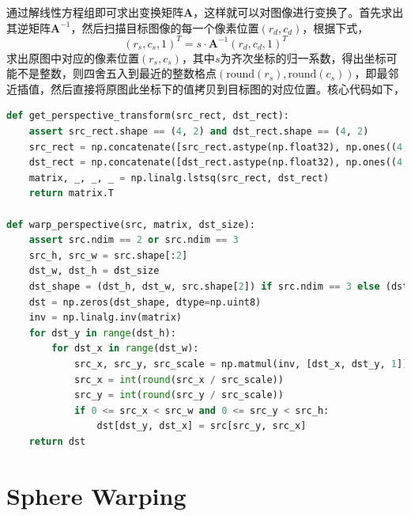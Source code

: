 \documentclass[12pt,a4paper]{article}
\begin{document}
通过解线性方程组即可求出变换矩阵$\boldsymbol{A}$，这样就可以对图像进行变换了。首先求出其逆矩阵$\boldsymbol{A}^{-1}$，然后扫描目标图像的每一个像素位置$(r_d, c_d)$，根据下式，
\begin{equation}
    (r_s, c_s, 1)^T = s \cdot \boldsymbol{A}^{-1} (r_d, c_d, 1)^T
\end{equation}
求出原图中对应的像素位置$(r_s, c_s)$，其中$s$为齐次坐标的归一系数，得出坐标可能不是整数，则四舍五入到最近的整数格点$(\text{round}(r_s), \text{round}(c_s))$，即最邻近插值，然后直接将原图此坐标下的值拷贝到目标图的对应位置。核心代码如下，
\begin{lstlisting}[language=Python]
def get_perspective_transform(src_rect, dst_rect):
    assert src_rect.shape == (4, 2) and dst_rect.shape == (4, 2)
    src_rect = np.concatenate([src_rect.astype(np.float32), np.ones((4, 1), dtype=np.float32)], axis=-1)
    dst_rect = np.concatenate([dst_rect.astype(np.float32), np.ones((4, 1), dtype=np.float32)], axis=-1)
    matrix, _, _, _ = np.linalg.lstsq(src_rect, dst_rect)
    return matrix.T

def warp_perspective(src, matrix, dst_size):
    assert src.ndim == 2 or src.ndim == 3
    src_h, src_w = src.shape[:2]
    dst_w, dst_h = dst_size
    dst_shape = (dst_h, dst_w, src.shape[2]) if src.ndim == 3 else (dst_h, dst_w)
    dst = np.zeros(dst_shape, dtype=np.uint8)
    inv = np.linalg.inv(matrix)
    for dst_y in range(dst_h):
        for dst_x in range(dst_w):
            src_x, src_y, src_scale = np.matmul(inv, [dst_x, dst_y, 1])
            src_x = int(round(src_x / src_scale))
            src_y = int(round(src_y / src_scale))
            if 0 <= src_x < src_w and 0 <= src_y < src_h:
                dst[dst_y, dst_x] = src[src_y, src_x]
    return dst
\end{lstlisting}

\section{Sphere Warping}
\end{document}

